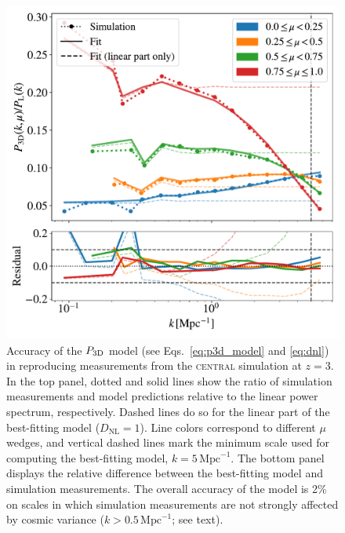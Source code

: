 \documentclass[longauth]{aa}
\newcommand{\pthreed}{\ensuremath{P_{\rm 3D}}\xspace}
\newcommand{\simcentral}{\textsc{central}\xspace}
\newcommand{\iMpc}{\ensuremath{\,\mathrm{Mpc}^{-1}}}
\begin{document}
\begin{figure}
\includegraphics[width=\columnwidth]{figures/motivate.pdf}
\centering
\caption{Accuracy of the \pthreed model (see Eqs.~\ref{eq:p3d_model} and \ref{eq:dnl}) in reproducing measurements from the \simcentral simulation at $z=3$. In the top panel, dotted and solid lines show the ratio of simulation measurements and model predictions relative to the linear power spectrum, respectively. Dashed lines do so for the linear part of the best-fitting model ($D_\mathrm{NL}=1$). Line colors correspond to different $\mu$ wedges, and vertical dashed lines mark the minimum scale used for computing the best-fitting model, $k=5\iMpc$. The bottom panel displays the relative difference between the best-fitting model and simulation measurements. The overall accuracy of the model is 2\% on scales in which simulation measurements are not strongly affected by cosmic variance ($k>0.5\iMpc$; see text).
}
\label{fig:arinyo}
\end{figure}
\end{document}

